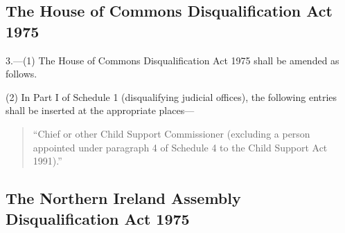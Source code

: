 \documentclass[12pt,a4paper]{article}
\begin{document}
%


\subsection*{The House of Commons Disqualification Act 1975}

3.---(1) The House of Commons Disqualification Act 1975 shall be amended as follows.

(2) In Part I of Schedule 1 (disqualifying judicial offices), the following entries shall be inserted at the appropriate places— 
\begin{quotation}
“Chief or other Child Support Commissioner (excluding a person appointed under paragraph 4 of Schedule 4 to the Child Support Act 1991).''
\end{quotation}



\subsection*{The Northern Ireland Assembly Disqualification Act 1975}
\end{document}
